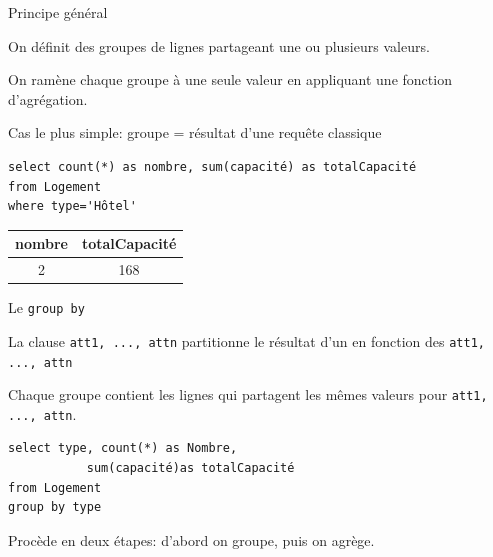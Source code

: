 

\begin{frame}[fragile]{Principe général}

On définit des \alert{groupes} de lignes partageant une ou plusieurs valeurs.

\vfill

On ramène chaque groupe à une seule valeur en appliquant une \alert{fonction d'agrégation}.

\vfill

Cas le plus simple:  groupe = résultat d'une requête classique


\begin{verbatim}
select count(*) as nombre, sum(capacité) as totalCapacité
from Logement
where type='Hôtel'
\end{verbatim}

\vfill

\begin{tabular}{c|c}
\textbf{nombre} & \textbf{totalCapacité}\\ \hline 
2 & 168\\ \hline 
\end{tabular}

\end{frame}

\begin{frame}[fragile]{Le \texttt{group by}}

La clause  \texttt{att1, ..., attn} \alert{partitionne} le résultat d'un
 en fonction des \texttt{att1, ..., attn}

\vfill 

Chaque \alert{groupe} contient les lignes qui partagent les mêmes valeurs pour \texttt{att1, ..., attn}.

\vfill

\begin{verbatim}
select type, count(*) as Nombre, 
           sum(capacité)as totalCapacité
from Logement
group by type
\end{verbatim}

\vfill
Procède en deux étapes: d'abord on groupe, puis on agrège.
\end{frame}


